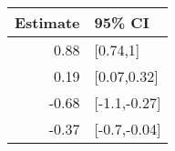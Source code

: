 \begin{tabular}{rl}
  \hline
Estimate & 95\% CI \\ 
  \hline
0.88 & [0.74,1] \\ 
  0.19 & [0.07,0.32] \\ 
  -0.68 & [-1.1,-0.27] \\ 
  -0.37 & [-0.7,-0.04] \\ 
   \hline
\end{tabular}

